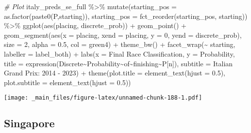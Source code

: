 \documentclass[
]{book}
\newenvironment{Shaded}{\begin{snugshade}}{\end{snugshade}}
\newcommand{\AttributeTok}[1]{\textcolor[rgb]{0.77,0.63,0.00}{#1}}
\newcommand{\CommentTok}[1]{\textcolor[rgb]{0.56,0.35,0.01}{\textit{#1}}}
\newcommand{\DecValTok}[1]{\textcolor[rgb]{0.00,0.00,0.81}{#1}}
\newcommand{\FloatTok}[1]{\textcolor[rgb]{0.00,0.00,0.81}{#1}}
\newcommand{\FunctionTok}[1]{\textcolor[rgb]{0.00,0.00,0.00}{#1}}
\newcommand{\NormalTok}[1]{#1}
\newcommand{\SpecialCharTok}[1]{\textcolor[rgb]{0.00,0.00,0.00}{#1}}
\newcommand{\StringTok}[1]{\textcolor[rgb]{0.31,0.60,0.02}{#1}}
\begin{document}
\begin{Shaded}
\begin{Highlighting}[]
\CommentTok{\# Plot}
\NormalTok{italy\_preds\_se\_full }\SpecialCharTok{\%\textgreater{}\%}
  \FunctionTok{mutate}\NormalTok{(}\AttributeTok{starting\_pos =} \FunctionTok{as.factor}\NormalTok{(}\FunctionTok{paste0}\NormalTok{(}\StringTok{\textquotesingle{}P\textquotesingle{}}\NormalTok{,starting)),}
         \AttributeTok{starting\_pos =} \FunctionTok{fct\_reorder}\NormalTok{(starting\_pos, starting)) }\SpecialCharTok{\%\textgreater{}\%}
  \FunctionTok{ggplot}\NormalTok{(}\FunctionTok{aes}\NormalTok{(placing, discrete\_prob)) }\SpecialCharTok{+}
  \FunctionTok{geom\_point}\NormalTok{() }\SpecialCharTok{+}
  \FunctionTok{geom\_segment}\NormalTok{(}\FunctionTok{aes}\NormalTok{(}\AttributeTok{x =}\NormalTok{ placing, }\AttributeTok{xend =}\NormalTok{ placing, }\AttributeTok{y =} \DecValTok{0}\NormalTok{, }\AttributeTok{yend =}\NormalTok{ discrete\_prob),}
               \AttributeTok{size =} \DecValTok{2}\NormalTok{, }\AttributeTok{alpha =} \FloatTok{0.5}\NormalTok{, }\AttributeTok{col =} \StringTok{\textquotesingle{}green4\textquotesingle{}}\NormalTok{) }\SpecialCharTok{+}
  \FunctionTok{theme\_bw}\NormalTok{() }\SpecialCharTok{+}
  \FunctionTok{facet\_wrap}\NormalTok{(}\SpecialCharTok{\textasciitilde{}}\NormalTok{ starting, }\AttributeTok{labeller =}\NormalTok{ label\_both) }\SpecialCharTok{+}
  \FunctionTok{labs}\NormalTok{(}\AttributeTok{x =} \StringTok{\textquotesingle{}Final Race Classification\textquotesingle{}}\NormalTok{,}
       \AttributeTok{y =} \StringTok{\textquotesingle{}Probability\textquotesingle{}}\NormalTok{,}
       \AttributeTok{title =} \FunctionTok{expression}\NormalTok{(Discrete}\SpecialCharTok{\textasciitilde{}}\NormalTok{Probability}\SpecialCharTok{\textasciitilde{}}\NormalTok{of}\SpecialCharTok{\textasciitilde{}}\NormalTok{finishing}\SpecialCharTok{\textasciitilde{}}\NormalTok{P[n]),}
       \AttributeTok{subtitle =} \StringTok{\textquotesingle{}Italian Grand Prix: 2014 {-} 2023\textquotesingle{}}\NormalTok{) }\SpecialCharTok{+}
  \FunctionTok{theme}\NormalTok{(}\AttributeTok{plot.title =} \FunctionTok{element\_text}\NormalTok{(}\AttributeTok{hjust =} \FloatTok{0.5}\NormalTok{),}
        \AttributeTok{plot.subtitle =} \FunctionTok{element\_text}\NormalTok{(}\AttributeTok{hjust =} \FloatTok{0.5}\NormalTok{)) }
\end{Highlighting}
\end{Shaded}

\texttt{[image: \_main\_files/figure-latex/unnamed-chunk-188-1.pdf]}

\hypertarget{singapore}{%
\subsection{Singapore}\label{singapore}}
\end{document}
